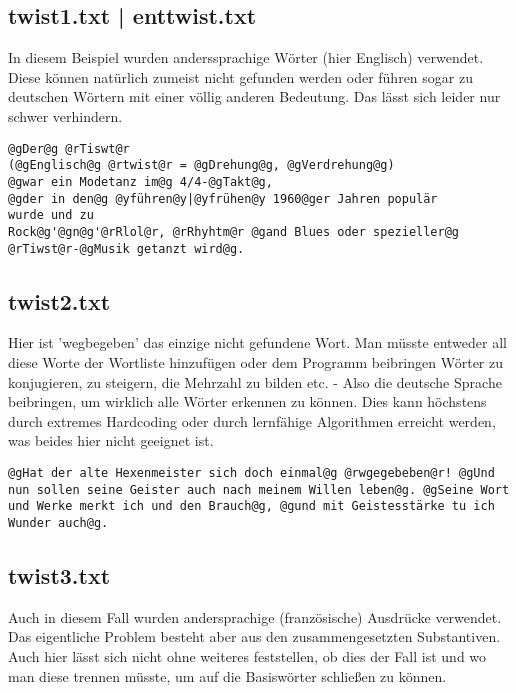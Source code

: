 \documentclass[a4paper,10pt,ngerman]{scrartcl}
\begin{document}

\vspace{1\baselineskip}
\subsection[twist1.txt]{twist1.txt | enttwist.txt}
In diesem Beispiel wurden anderssprachige Wörter (hier Englisch) verwendet. Diese können natürlich zumeist nicht gefunden werden oder führen sogar zu deutschen Wörtern mit einer völlig anderen Bedeutung. Das lässt sich leider nur schwer verhindern.

\begin{lstlisting}
@gDer@g @rTiswt@r
(@gEnglisch@g @rtwist@r = @gDrehung@g, @gVerdrehung@g)
@gwar ein Modetanz im@g 4/4-@gTakt@g,
@gder in den@g @yführen@y|@yfrühen@y 1960@ger Jahren populär
wurde und zu
Rock@g'@gn@g'@rRlol@r, @rRhyhtm@r @gand Blues oder spezieller@g
@rTiwst@r-@gMusik getanzt wird@g.
\end{lstlisting}

\vspace{1\baselineskip}
\subsection{twist2.txt}
Hier ist 'wegbegeben' das einzige nicht gefundene Wort. Man müsste entweder all diese Worte der Wortliste hinzufügen oder dem Programm beibringen Wörter zu konjugieren, zu steigern, die Mehrzahl zu bilden etc. - Also die deutsche Sprache beibringen, um wirklich alle Wörter erkennen zu können. Dies kann höchstens durch extremes Hardcoding oder durch lernfähige Algorithmen erreicht werden, was beides hier nicht geeignet ist.

\begin{lstlisting}
@gHat der alte Hexenmeister sich doch einmal@g @rwgegebeben@r! @gUnd nun sollen seine Geister auch nach meinem Willen leben@g. @gSeine Wort und Werke merkt ich und den Brauch@g, @gund mit Geistesstärke tu ich Wunder auch@g.
\end{lstlisting}

\vspace{1\baselineskip}
\subsection{twist3.txt}
Auch in diesem Fall wurden andersprachige (französische) Ausdrücke verwendet. Das eigentliche Problem besteht aber aus den zusammengesetzten Substantiven. Auch hier lässt sich nicht ohne weiteres feststellen, ob dies der Fall ist und wo man diese trennen müsste, um auf die Basiswörter schließen zu können.
\end{document}
